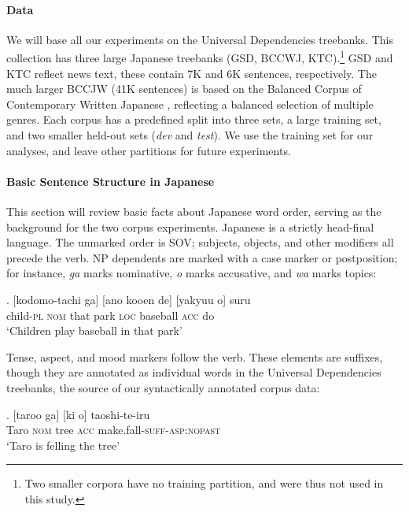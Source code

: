 \documentclass[11pt,a4paper]{article}
\begin{document}
\paragraph{Data}
We will base all our experiments on the Universal Dependencies \citep{nivre2019universal} treebanks.
This collection has three large Japanese treebanks (GSD, BCCWJ, KTC).\footnote{Two smaller corpora have no training partition, and were thus not used in this study.}
GSD and KTC reflect news text, these contain 7K and 6K sentences, respectively.
The much larger BCCJW (41K sentences) is based on the Balanced Corpus of Contemporary Written Japanese \citep{Maekawa2014}, reflecting a balanced selection of multiple genres.
Each corpus has a predefined split into three sets, a large training set, and two smaller held-out sets (\textit{dev} and \textit{test}).
We use the training set for our analyses, and leave other partitions for future experiments.


\paragraph{Basic Sentence Structure in Japanese}
This section will review basic facts about Japanese word order, serving as the background for the two corpus experiments.
Japanese is a strictly head-final language. The unmarked order is SOV; subjects, objects, and other modifiers all precede the verb.
NP dependents are marked with a case marker or postposition; for instance, \emph{ga} marks nominative, \emph{o} marks accusative, and \emph{wa} marks topics:


\exg. [kodomo-tachi ga] [ano kooen de] [yakyuu o] suru \\
child-\textsc{pl} \textsc{nom} that park \textsc{loc} baseball \textsc{acc} do \\
`Children play baseball in that park' \citep[p. 118]{iwasaki2013japanese}

Tense, aspect, and mood markers follow the verb.
These elements are suffixes, though they are annotated as individual words in the Universal Dependencies \citep{nivre2019universal} treebanks, the source of our syntactically annotated corpus data:

\exg. [taroo ga] [ki o] taoshi-te-iru \\
Taro \textsc{nom} tree \textsc{acc} make.fall-\textsc{suff}-\textsc{asp:nopast} \\
`Taro is felling the tree' \citep[p. 138]{iwasaki2013japanese} \label{ex:taro-tree}
\end{document}
